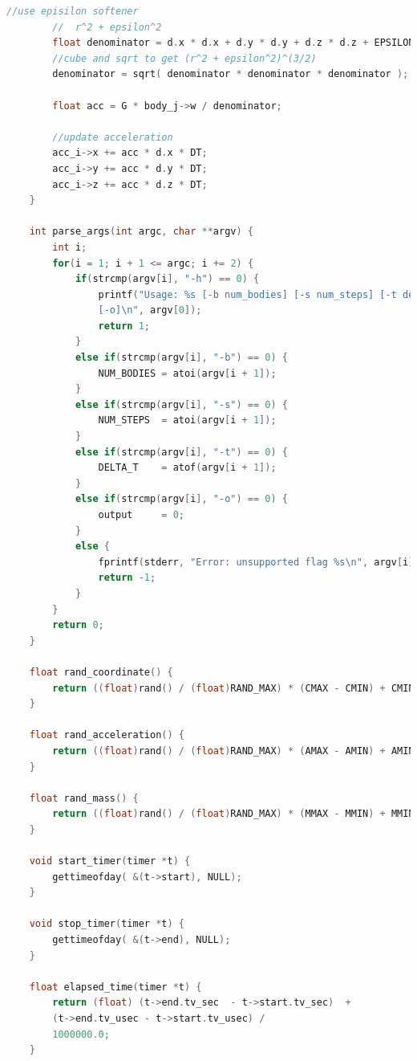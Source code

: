 \documentclass[10pt,a4paper]{article}
\begin{document}
\begin{lstlisting}[language=c]
		//use episilon softener
		//  r^2 + epsilon^2
		float denominator = d.x * d.x + d.y * d.y + d.z * d.z + EPSILON2;
		//cube and sqrt to get (r^2 + epsilon^2)^(3/2)
		denominator = sqrt( denominator * denominator * denominator );
		
		float acc = G * body_j->w / denominator;
		
		//update acceleration
		acc_i->x += acc * d.x * DT;
		acc_i->y += acc * d.y * DT;
		acc_i->z += acc * d.z * DT;
	}
	
	int parse_args(int argc, char **argv) {
		int i;
		for(i = 1; i + 1 <= argc; i += 2) {
			if(strcmp(argv[i], "-h") == 0) {
				printf("Usage: %s [-b num_bodies] [-s num_steps] [-t delta_t] \
				[-o]\n", argv[0]);
				return 1;
			}
			else if(strcmp(argv[i], "-b") == 0) {
				NUM_BODIES = atoi(argv[i + 1]);
			}
			else if(strcmp(argv[i], "-s") == 0) {
				NUM_STEPS  = atoi(argv[i + 1]);
			}
			else if(strcmp(argv[i], "-t") == 0) {
				DELTA_T    = atof(argv[i + 1]);
			}
			else if(strcmp(argv[i], "-o") == 0) {
				output     = 0;
			}
			else {
				fprintf(stderr, "Error: unsupported flag %s\n", argv[i]);
				return -1;
			}
		}
		return 0;
	}
	
	float rand_coordinate() {
		return ((float)rand() / (float)RAND_MAX) * (CMAX - CMIN) + CMIN;
	}
	
	float rand_acceleration() {
		return ((float)rand() / (float)RAND_MAX) * (AMAX - AMIN) + AMIN;
	}
	
	float rand_mass() { 
		return ((float)rand() / (float)RAND_MAX) * (MMAX - MMIN) + MMIN;
	}
	
	void start_timer(timer *t) {
		gettimeofday( &(t->start), NULL);
	}
	
	void stop_timer(timer *t) {
		gettimeofday( &(t->end), NULL);
	}
	
	float elapsed_time(timer *t) {
		return (float) (t->end.tv_sec  - t->start.tv_sec)  + 
		(t->end.tv_usec - t->start.tv_usec) /
		1000000.0;
	}
	\end{lstlisting}
	
\end{document}
